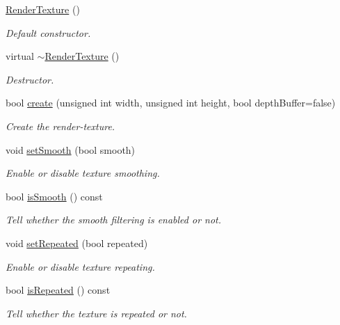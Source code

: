 \begin{DoxyCompactItemize}
\item 
\hyperlink{classsf_1_1_render_texture_a19ee6e5b4c40ad251803389b3953a9c6}{Render\+Texture} ()
\begin{DoxyCompactList}\small\item\em Default constructor. \end{DoxyCompactList}\item 
\mbox{\label{classsf_1_1_render_texture_a94b84ab9335be84d2a014c964d973304}} 
virtual \hyperlink{classsf_1_1_render_texture_a94b84ab9335be84d2a014c964d973304}{$\sim$\+Render\+Texture} ()
\begin{DoxyCompactList}\small\item\em Destructor. \end{DoxyCompactList}\item 
bool \hyperlink{classsf_1_1_render_texture_aefbb76eb3b87e368ab974b2660931ccb}{create} (unsigned int width, unsigned int height, bool depth\+Buffer=false)
\begin{DoxyCompactList}\small\item\em Create the render-\/texture. \end{DoxyCompactList}\item 
void \hyperlink{classsf_1_1_render_texture_af08991e63c6020865dd07b20e27305b6}{set\+Smooth} (bool smooth)
\begin{DoxyCompactList}\small\item\em Enable or disable texture smoothing. \end{DoxyCompactList}\item 
bool \hyperlink{classsf_1_1_render_texture_a5b43c007ab6643accc5dae84b5bc8f61}{is\+Smooth} () const
\begin{DoxyCompactList}\small\item\em Tell whether the smooth filtering is enabled or not. \end{DoxyCompactList}\item 
void \hyperlink{classsf_1_1_render_texture_af8f97b33512bf7d5b6be3da6f65f7365}{set\+Repeated} (bool repeated)
\begin{DoxyCompactList}\small\item\em Enable or disable texture repeating. \end{DoxyCompactList}\item 
bool \hyperlink{classsf_1_1_render_texture_a81c5a453a21c7e78299b062b97dc8c87}{is\+Repeated} () const
\begin{DoxyCompactList}\small\item\em Tell whether the texture is repeated or not. \end{DoxyCompactList}\item 

\end{DoxyCompactItemize}
